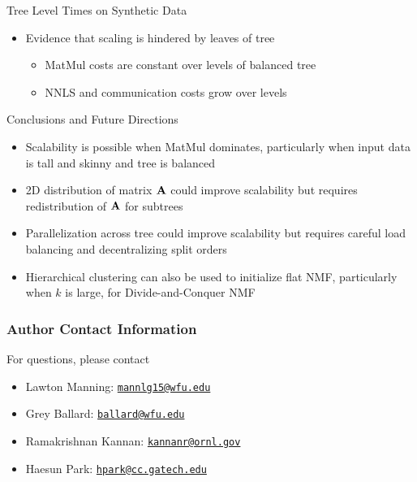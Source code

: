 \documentclass{beamer}
\newcommand{\email}[1]{\href{mailto:#1}{\texttt{#1}}}
\begin{document}
\begin{frame}{Tree Level Times on Synthetic Data}
\vfill
    
\begin{itemize}
    \item Evidence that scaling is hindered by leaves of tree
    \begin{itemize}
    	\item MatMul costs are constant over levels of balanced tree 
	\item NNLS and communication costs grow over levels
    \end{itemize}
\end{itemize}
    
\end{frame}

\begin{frame}{Conclusions and Future Directions}

\begin{itemize}
	\item Scalability is possible when MatMul dominates, particularly when input data is tall and skinny and tree is balanced
	\vfill
	\item 2D distribution of matrix $\M{A}$ could improve scalability but requires redistribution of $\M{A}$ for subtrees
	\vfill
	\item Parallelization across tree could improve scalability but requires careful load balancing and decentralizing split orders
	\vfill
	\item Hierarchical clustering can also be used to initialize flat NMF, particularly when $k$ is large, for Divide-and-Conquer NMF
\end{itemize}

\end{frame}



\begin{frame}
    \frametitle{Author Contact Information}
    
    For questions, please contact
    \begin{itemize}
        \item Lawton Manning: \email{mannlg15@wfu.edu}
        \item Grey Ballard: \email{ballard@wfu.edu}
        \item Ramakrishnan Kannan: \email{kannanr@ornl.gov}
        \item Haesun Park: \email{hpark@cc.gatech.edu}
    \end{itemize}
    
\end{frame}
    
\end{document}
